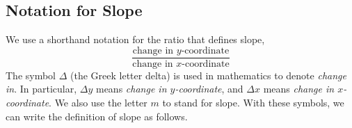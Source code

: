 \documentclass[10pt,]{book}
\theoremstyle{plain}
\theoremstyle{definition}
\theoremstyle{definition}
\theoremstyle{definition}
\theoremstyle{definition}
\theoremstyle{definition}
\numberwithin{equation}{section}
\begin{document}
\subsection[Notation for Slope]{Notation for Slope}\label{subsection-20}

    We use a shorthand notation for the ratio that defines slope,
    \begin{equation*}\frac{\text{change in }y\text{-coordinate}}{\text{change in }x\text{-coordinate}}\end{equation*} 
    The symbol \(\Delta\) (the Greek letter delta) is used in mathematics to denote \emph{change in}. In particular, \(\Delta y\) means \emph{change in \(y\)-coordinate}, and \(\Delta x\) means \emph{change in \(x\)-coordinate}. We also use the letter \(m\) to stand for slope. With these symbols, we can write the definition of slope as follows.
%
\typeout{************************************************}
\typeout{************************************************}
\end{document}
